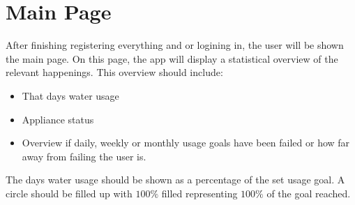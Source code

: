 \documentclass[10pt]{article}
\begin{document}
\section{Main Page}
After finishing registering everything and or logining in, the user will be shown the main page. On this page, the app will display a statistical overview of the relevant happenings. This overview should include:

\begin{itemize}
  \item That days water usage

  \item Appliance status

  \item Overview if daily, weekly or monthly usage goals have been failed or how far away from failing the user is.

\end{itemize}

The days water usage should be shown as a percentage of the set usage goal. A circle should be filled up with $100 \%$ filled representing $100 \%$ of the goal reached.
\end{document}
